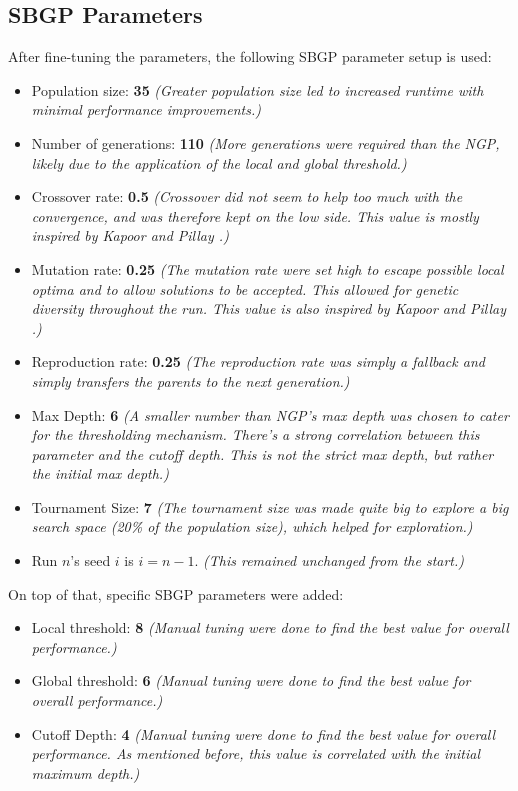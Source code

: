 \documentclass{article}
\begin{document}
\subsection{SBGP Parameters}
After fine-tuning the parameters, the following SBGP parameter setup is used:
\begin{itemize}
  \item Population size: \textbf{35} \emph{(Greater population size led to increased runtime with minimal performance improvements.)}
  \item Number of generations: \textbf{110} \emph{(More generations were required than the NGP, likely due to the application of the local and global threshold.)}
  \item Crossover rate: \textbf{0.5} \emph{(Crossover did not seem to help too much with the convergence, and was therefore kept on the low side. This value is mostly inspired by Kapoor and Pillay \cite{kapoor_genetic_2024}.)}
  \item Mutation rate: \textbf{0.25} \emph{(The mutation rate were set high to escape possible local optima and to allow solutions to be accepted. This allowed for genetic diversity throughout the run. This value is also inspired by Kapoor and Pillay \cite{kapoor_genetic_2024}.)}
  \item Reproduction rate: \textbf{0.25 }\emph{(The reproduction rate was simply a fallback and simply transfers the parents to the next generation.)}
  \item Max Depth: \textbf{6} \emph{(A smaller number than NGP's max depth was chosen to cater for the thresholding mechanism. There's a strong correlation between this parameter and the cutoff depth. This is not the strict max depth, but rather the initial max depth.)} 
  \item Tournament Size: \textbf{7} \emph{(The tournament size was made quite big to explore a big search space (20\% of the population size), which helped for exploration.)}
  \item Run \(n\)'s seed \(i\) is \(i = n-1\). \emph{(This remained unchanged from the start.)}
\end{itemize}
On top of that, specific SBGP parameters were added:
\begin{itemize}
  \item Local threshold: \textbf{8} \emph{(Manual tuning were done to find the best value for overall performance.)}
  \item Global threshold: \textbf{6} \emph{(Manual tuning were done to find the best value for overall performance.)}
  \item Cutoff Depth: \textbf{4} \emph{(Manual tuning were done to find the best value for overall performance. As mentioned before, this value is correlated with the initial maximum depth.)}
\end{itemize}
\end{document}
